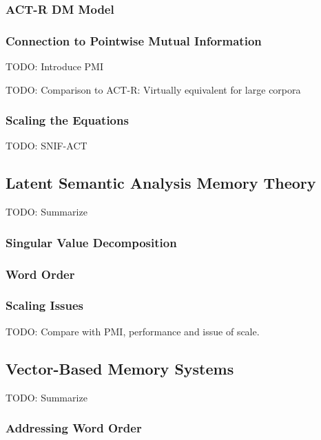 \documentclass[man]{apa6}
\begin{document}
\subsubsection{ACT-R DM Model}

\subsubsection{Connection to Pointwise Mutual Information}

TODO: Introduce PMI \cite{Farahat2004}

TODO: Comparison to ACT-R: Virtually equivalent for large corpora \cite{Farahat2004}

\subsubsection{Scaling the Equations}

\cite{Douglass2010}

TODO: SNIF-ACT \cite{Fu2007} \cite{Pirolli2003}

\subsection{Latent Semantic Analysis Memory Theory}

TODO: Summarize \cite{Landauer1997}

\subsubsection{Singular Value Decomposition}

\subsubsection{Word Order}

\subsubsection{Scaling Issues}

TODO: Compare with PMI, performance and issue of scale. \cite{Budiu2007}

\subsection{Vector-Based Memory Systems}

TODO: Summarize \cite{Plate1995}

\subsubsection{Addressing Word Order}
\end{document}
